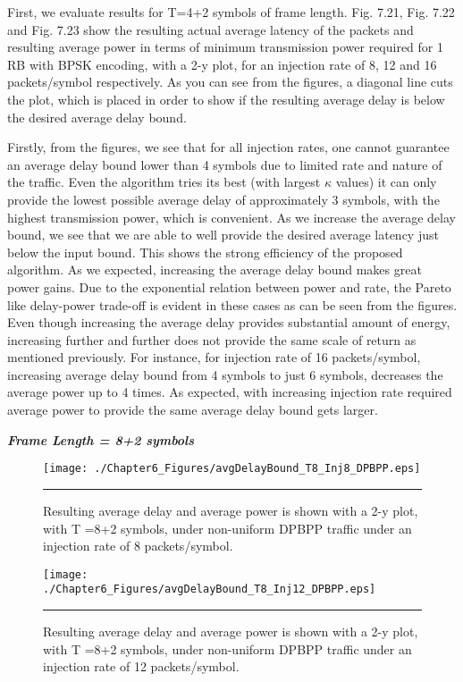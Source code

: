 First, we evaluate results for T=4+2 symbols of frame length. Fig. 7.21, Fig. 7.22 and Fig. 7.23 show the resulting actual average latency of the packets and resulting average power in terms of minimum transmission power required for 1 RB with BPSK encoding, with a 2-y plot, for an injection rate of 8, 12 and 16 packets/symbol respectively. As you can see from the figures, a diagonal line cuts the plot, which is placed in order to show if the resulting average delay is below the desired average delay bound. 


Firstly, from the figures, we see that for all injection rates, one cannot guarantee an average delay bound lower than 4 symbols due to limited rate and nature of the traffic. Even the algorithm tries its best (with largest $\kappa$ values) it can only provide the lowest possible average delay of approximately 3 symbols, with the highest transmission power, which is convenient. As we increase the average delay bound, we see that we are able to well provide the desired average latency just below the input bound. This shows the strong efficiency of the proposed algorithm. As we expected, increasing the average delay bound makes great power gains. Due to the exponential relation between power and rate, the Pareto like delay-power trade-off is evident in these cases as can be seen from the figures. Even though increasing the average delay provides substantial amount of energy, increasing further and further does not provide the same scale of return as mentioned previously. For instance, for injection rate of 16 packets/symbol, increasing average delay bound from 4 symbols to just 6 symbols, decreases the average power up to 4 times. As expected, with increasing injection rate required average power to provide the same average delay bound gets larger.


\textbf{\textit{Frame Length = 8+2 symbols}}
\begin{figure}[t!]
  \centering
    \texttt{[image: ./Chapter6\_Figures/avgDelayBound\_T8\_Inj8\_DPBPP.eps]}
    \rule{35em}{0.5pt}
  \caption[Resulting average delay and average power is shown with a 2-y plot, with T =8+2 symbols, under non-uniform DPBPP traffic under an injection rate of 8 packets/symbol.]{Resulting average delay and average power is shown with a 2-y plot, with T =8+2 symbols, under non-uniform DPBPP traffic under an injection rate of 8 packets/symbol.} 
  \label{fig:Electron}
\end{figure}

\begin{figure}[t!]
  \centering
    \texttt{[image: ./Chapter6\_Figures/avgDelayBound\_T8\_Inj12\_DPBPP.eps]}
    \rule{35em}{0.5pt}
  \caption[Resulting average delay and average power is shown with a 2-y plot, with T =8+2 symbols, under non-uniform DPBPP traffic under an injection rate of 12 packets/symbol.]{Resulting average delay and average power is shown with a 2-y plot, with T =8+2 symbols, under non-uniform DPBPP traffic under an injection rate of 12 packets/symbol.} 
  \label{fig:Electron}
\end{figure}

